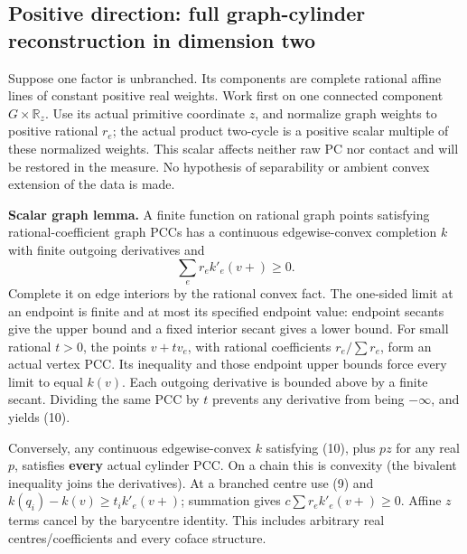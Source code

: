 \documentclass[
  11pt,
]{article}
\begin{document}
\subsection{Positive direction: full graph-cylinder reconstruction in
dimension
two}\label{positive-direction-full-graph-cylinder-reconstruction-in-dimension-two}

Suppose one factor is unbranched. Its components are complete rational
affine lines of constant positive real weights. Work first on one
connected component \(G\times\mathbb{R}_z\). Use its actual primitive
coordinate \(z\), and normalize graph weights to positive rational
\(r_e\); the actual product two-cycle is a positive scalar multiple of
these normalized weights. This scalar affects neither raw PC nor contact
and will be restored in the measure. No hypothesis of separability or
ambient convex extension of the data is made.

\textbf{Scalar graph lemma.} A finite function on rational graph points
satisfying rational-coefficient graph PCCs has a continuous
edgewise-convex completion \(k\) with finite outgoing derivatives and \[
                              \sum_e r_e k'_e(v+)\geq0.        \tag{10}
\] Complete it on edge interiors by the rational convex fact. The
one-sided limit at an endpoint is finite and at most its specified
endpoint value: endpoint secants give the upper bound and a fixed
interior secant gives a lower bound. For small rational \(t>0\), the
points \(v+t v_e\), with rational coefficients \(r_e/\sum r_e\), form an
actual vertex PCC. Its inequality and those endpoint upper bounds force
every limit to equal \(k(v)\). Each outgoing derivative is bounded above
by a finite secant. Dividing the same PCC by \(t\) prevents any
derivative from being \(-\infty\), and yields (10).

Conversely, any continuous edgewise-convex \(k\) satisfying (10), plus
\(pz\) for any real \(p\), satisfies \textbf{every} actual cylinder PCC.
On a chain this is convexity (the bivalent inequality joins the
derivatives). At a branched centre use (9) and
\(k(q_i)-k(v)\geq t_i k'_e(v+)\); summation gives
\(c\sum r_e k'_e(v+)\geq0\). Affine \(z\) terms cancel by the barycentre
identity. This includes arbitrary real centres/coefficients and every
coface structure.
\end{document}
